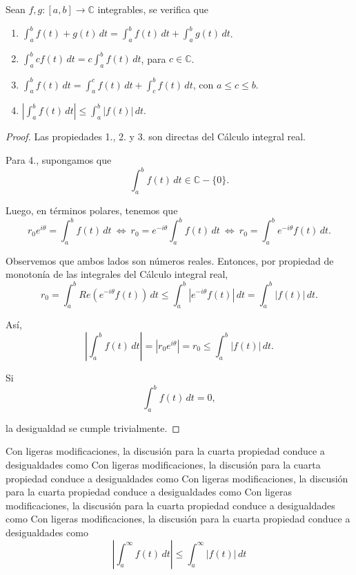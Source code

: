 \begin{propo}
Sean $f, g: [a,b] \longrightarrow \mathbb{C}$ integrables, se verifica que 

\begin{enumerate}

\item $\int_a^b f(t) + g(t) \,dt = \int_a^b f(t) \,dt + \int_a^b g(t) \,dt$.

\item $\int_a^b c f(t) \,dt = c \int_a^b f(t) \,dt$, para $c \in \mathbb{C}$.

\item $\int_a^b f(t) \,dt = \int_a^c f(t) \,dt + \int_c^b f(t) \,dt$, con $a \leq c \leq b$.

\item $\left| \int_a^b f(t) \,dt \right| \leq \int_a^b |f(t)| \,dt$.
\end{enumerate}
\end{propo}

\begin{proof}
Las propiedades 1., 2. y 3. son directas del Cálculo integral real.

Para 4., supongamos que 
$$\int_a^b f(t) \,dt \in \mathbb{C}-\{0\}.$$

Luego, en términos polares, tenemos que
$$r_0 e^{i\theta} = \int_a^b f(t) \,dt ~\Leftrightarrow~ r_0 = e^{-i\theta} \int_a^b f(t) \,dt ~\Leftrightarrow~ r_0 = \int_a^b e^{-i\theta} f(t) \,dt. $$

Observemos que ambos lados son números reales. Entonces, por propiedad de monotonía de las integrales del Cálculo integral real,
$$r_0 = \int_a^b Re \left( e^{-i\theta} f(t)\right) \,dt \leq \int_a^b  \left|e^{-i\theta} f(t) \right| \,dt = \int_a^b |f(t)| \,dt.$$

Así, 
$$\left|\int_a^b f(t) \,dt \right| = |r_0 e^{i\theta}| = r_0 \leq \int_a^b |f(t)|\,dt.$$

Si 
$$\int_a^b f(t) \,dt = 0,$$

la desigualdad se cumple trivialmente.

\end{proof}

Con ligeras modificaciones, la discusión para la cuarta propiedad conduce a desigualdades como
Con ligeras modificaciones, la discusión para la cuarta propiedad conduce a desigualdades como
Con ligeras modificaciones, la discusión para la cuarta propiedad conduce a desigualdades como
Con ligeras modificaciones, la discusión para la cuarta propiedad conduce a desigualdades como
Con ligeras modificaciones, la discusión para la cuarta propiedad conduce a desigualdades como
$$\left|\int_a^{\infty} f(t) \,dt \right| \leq \int_a^{\infty} |f(t)| \,dt$$

